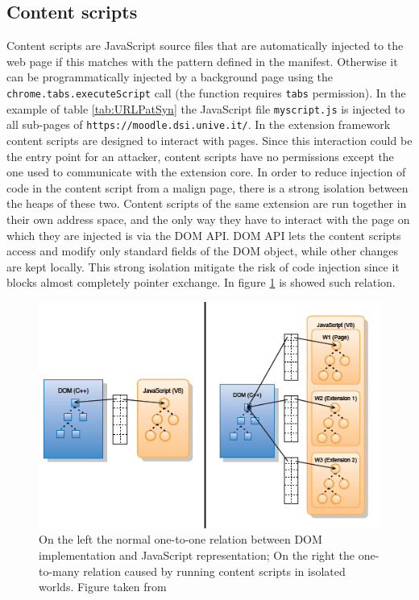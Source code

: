 \subsection{Content scripts}
Content scripts are JavaScript source files that are automatically injected to the web page if this matches with the pattern defined in the manifest. Otherwise it can be programmatically injected by a background page using the \texttt{chrome.tabs.executeScript} call (the function requires \texttt{tabs} permission). In the example of table \ref{tab:URLPatSyn} the JavaScript file \texttt{myscript.js} is injected to all sub-pages of \texttt{https://moodle.dsi.unive.it/}. In the extension framework content scripts are designed to interact with pages. Since this interaction could be the entry point for an attacker, content scripts have no permissions except the one used to communicate with the extension core. In order to reduce injection of code in the content script from a malign page, there is a strong isolation between the heaps of these two. Content scripts of the same extension are run together in their own address space, and the only way they have to interact with the page on which they are injected is via the DOM API. DOM API lets the content scripts access and modify only standard fields of the DOM object, while other changes are kept locally\cite{ChromeExtSpec}. This strong isolation mitigate the risk of code injection since it blocks almost completely pointer exchange. In figure \ref{fig:SepWorlds} is showed such relation.

\begin{figure}[htb]
    \centering
    \includegraphics[scale=1]{Both}
    \caption{On the left the normal one-to-one relation between DOM implementation and JavaScript representation; On the right the one-to-many relation caused by running content scripts in isolated worlds. Figure taken from \cite{ChromeExtSpec}}
    \label{fig:SepWorlds}
\end{figure}

